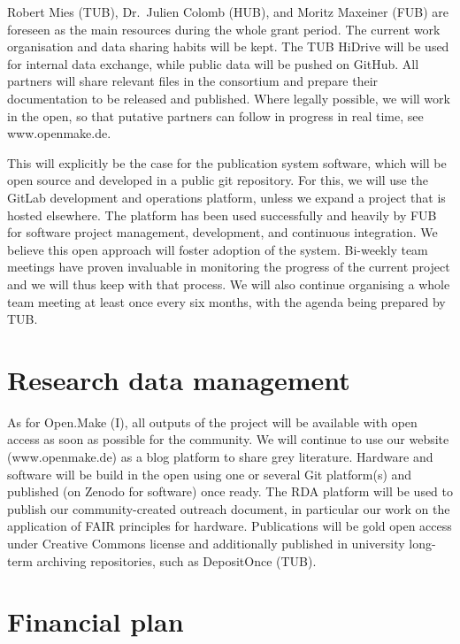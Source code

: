 \documentclass[
  12pt,
  a4paper,
]{article}
\begin{document}
Robert Mies (TUB), Dr.~Julien Colomb (HUB), and Moritz Maxeiner (FUB)
are foreseen as the main resources during the whole grant period. The
current work organisation and data sharing habits will be kept. The TUB
HiDrive will be used for internal data exchange, while public data will
be pushed on GitHub. All partners will share relevant files in the
consortium and prepare their documentation to be released and published.
Where legally possible, we will work in the open, so that putative
partners can follow in progress in real time, see www.openmake.de.

This will explicitly be the case for the publication system software,
which will be open source and developed in a public git repository. For
this, we will use the GitLab development and operations platform, unless
we expand a project that is hosted elsewhere. The platform has been used
successfully and heavily by FUB for software project management,
development, and continuous integration. We believe this open approach
will foster adoption of the system. Bi-weekly team meetings have proven
invaluable in monitoring the progress of the current project and we will
thus keep with that process. We will also continue organising a whole
team meeting at least once every six months, with the agenda being
prepared by TUB.

\hypertarget{research-data-management}{%
\section{Research data management}\label{research-data-management}}

As for Open.Make (I), all outputs of the project will be available with
open access as soon as possible for the community. We will continue to
use our website (www.openmake.de) as a blog platform to share grey
literature. Hardware and software will be build in the open using one or
several Git platform(s) and published (on Zenodo for software) once
ready. The RDA platform will be used to publish our community-created
outreach document, in particular our work on the application of FAIR
principles for hardware. Publications will be gold open access under
Creative Commons license and additionally published in university
long-term archiving repositories, such as DepositOnce (TUB).

\newpage

\hypertarget{financial-plan}{%
\section{Financial plan}\label{financial-plan}}
\end{document}
